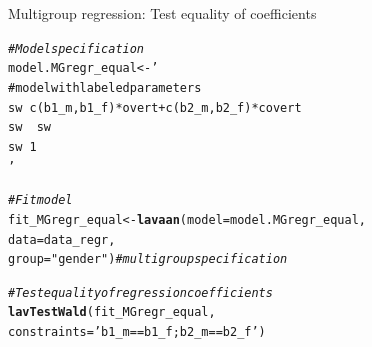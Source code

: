 \documentclass[10pt]{beamer}\usepackage[]{graphicx}\usepackage[]{xcolor}
\makeatletter
\newcommand{\hlstr}[1]{\textcolor[rgb]{0.192,0.494,0.8}{#1}}%
\newcommand{\hlcom}[1]{\textcolor[rgb]{0.678,0.584,0.686}{\textit{#1}}}%
\newcommand{\hlstd}[1]{\textcolor[rgb]{0.345,0.345,0.345}{#1}}%
\newcommand{\hlkwb}[1]{\textcolor[rgb]{0.69,0.353,0.396}{#1}}%
\newcommand{\hlkwc}[1]{\textcolor[rgb]{0.333,0.667,0.333}{#1}}%
\newcommand{\hlkwd}[1]{\textcolor[rgb]{0.737,0.353,0.396}{\textbf{#1}}}%
\newenvironment{kframe}{%
 \def\at@end@of@kframe{}%
 \ifinner\ifhmode%
  \def\at@end@of@kframe{\end{minipage}}%
  \begin{minipage}{\columnwidth}%
 \fi\fi%
 \def\FrameCommand##1{\hskip\@totalleftmargin \hskip-\fboxsep
 \colorbox{shadecolor}{##1}\hskip-\fboxsep
     \hskip-\linewidth \hskip-\@totalleftmargin \hskip\columnwidth}%
 \MakeFramed {\advance\hsize-\width
   \@totalleftmargin\z@ \linewidth\hsize
   \@setminipage}}%
 {\par\unskip\endMakeFramed%
 \at@end@of@kframe}
\newenvironment{knitrout}{}{} %
\makeatother
\begin{document}
%
%
\begin{frame}[fragile]{Multigroup regression: Test equality of coefficients}

\begin{knitrout}
\color{fgcolor}\begin{kframe}
\begin{alltt}
\hlcom{# Model specification}
\hlstd{model.MGregr_equal} \hlkwb{<-} \hlstr{'
  # model with labeled parameters
  sw ~ c(b1_m,b1_f)*overt + c(b2_m,b2_f)*covert 
  sw ~~ sw                                      
  sw ~ 1                                        
'}

\hlcom{# Fit model}
\hlstd{fit_MGregr_equal} \hlkwb{<-} \hlkwd{lavaan}\hlstd{(}\hlkwc{model} \hlstd{= model.MGregr_equal,}
                    \hlkwc{data} \hlstd{= data_regr,}
                    \hlkwc{group} \hlstd{=} \hlstr{"gender"}\hlstd{)} \hlcom{# multigroup specification }

\hlcom{# Test equality of regression coefficients}
\hlkwd{lavTestWald}\hlstd{(fit_MGregr_equal,}
            \hlkwc{constraints} \hlstd{=} \hlstr{'b1_m == b1_f; b2_m == b2_f'}\hlstd{)}
\end{alltt}
\end{kframe}
\end{knitrout}

\end{frame}


                    
  
\end{document}

